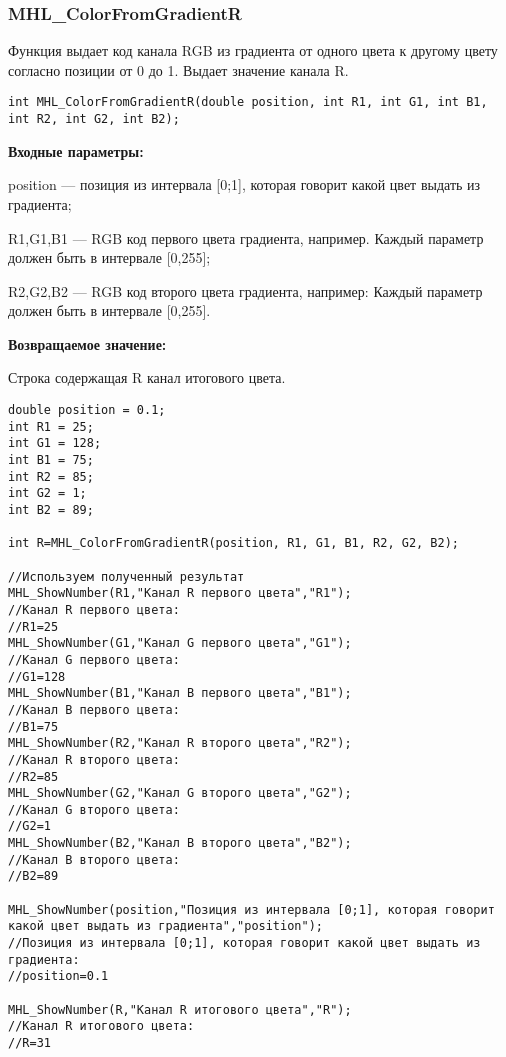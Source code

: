 \documentclass[a4paper,12pt]{article}
\begin{document}
\subsubsection{MHL\_ColorFromGradientR}\label{MHL_ColorFromGradientR}

Функция выдает код канала RGB из градиента от одного цвета к другому цвету согласно позиции от 0 до 1. Выдает значение канала R.


\begin{lstlisting}[label=code_syntax_MHL_ColorFromGradientR,caption=Синтаксис]
int MHL_ColorFromGradientR(double position, int R1, int G1, int B1, int R2, int G2, int B2);
\end{lstlisting}

\textbf{Входные параметры:}  

position --- позиция из интервала [0;1], которая говорит какой цвет выдать из градиента;
 
    R1,G1,B1 --- RGB код первого цвета градиента, например. Каждый параметр должен быть в интервале [0,255];
 
    R2,G2,B2 --- RGB код второго цвета градиента, например: Каждый параметр должен быть в интервале [0,255].

\textbf{Возвращаемое значение:}

Строка содержащая R канал итогового цвета.


\begin{lstlisting}[label=code_use_MHL_ColorFromGradientR,caption=Пример использования]
double position = 0.1;
int R1 = 25;
int G1 = 128;
int B1 = 75;
int R2 = 85;
int G2 = 1;
int B2 = 89;

int R=MHL_ColorFromGradientR(position, R1, G1, B1, R2, G2, B2);

//Используем полученный результат
MHL_ShowNumber(R1,"Канал R первого цвета","R1");
//Канал R первого цвета:
//R1=25
MHL_ShowNumber(G1,"Канал G первого цвета","G1");
//Канал G первого цвета:
//G1=128
MHL_ShowNumber(B1,"Канал B первого цвета","B1");
//Канал B первого цвета:
//B1=75
MHL_ShowNumber(R2,"Канал R второго цвета","R2");
//Канал R второго цвета:
//R2=85
MHL_ShowNumber(G2,"Канал G второго цвета","G2");
//Канал G второго цвета:
//G2=1
MHL_ShowNumber(B2,"Канал B второго цвета","B2");
//Канал B второго цвета:
//B2=89

MHL_ShowNumber(position,"Позиция из интервала [0;1], которая говорит какой цвет выдать из градиента","position");
//Позиция из интервала [0;1], которая говорит какой цвет выдать из градиента:
//position=0.1

MHL_ShowNumber(R,"Канал R итогового цвета","R");
//Канал R итогового цвета:
//R=31
\end{lstlisting}
\end{document}
